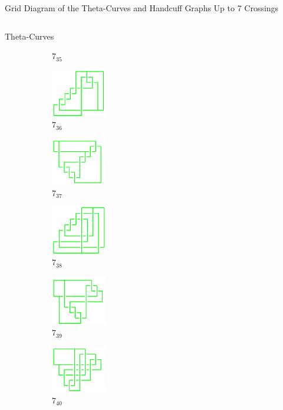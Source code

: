 \documentclass[final]{beamer}
\begin{document}
\begin{frame}[t]
\begin{alertblock}{Grid Diagram of the Theta-Curves and Handcuff Graphs Up to 7 Crossings}
\begin{columns}[t]
\begin{column}{0.6\textwidth}
\begin{alertblock}{Theta-Curves}
\begin{figure}
\begin{subfigure}{0.075\textwidth}
    \caption{$7_{35}$} 
    \end{subfigure}
    \begin{subfigure}{0.075\textwidth}
    \includegraphics[width=2.4cm]{../Midterm_Poster/grid_diagram/theta_7_36.png}
    \caption{$7_{36}$} 
    \end{subfigure}
    \begin{subfigure}{0.075\textwidth}
    \includegraphics[width=2.4cm]{../Midterm_Poster/grid_diagram/theta_7_37.png}
    \caption{$7_{37}$} 
    \end{subfigure}
    \begin{subfigure}{0.075\textwidth}
    \includegraphics[width=2.4cm]{../Midterm_Poster/grid_diagram/theta_7_38.png}
    \caption{$7_{38}$} 
    \end{subfigure}
    \begin{subfigure}{0.075\textwidth}
    \includegraphics[width=2.4cm]{../Midterm_Poster/grid_diagram/theta_7_39.png}
    \caption{$7_{39}$} 
    \end{subfigure}
    \begin{subfigure}{0.075\textwidth}
    \includegraphics[width=2.4cm]{../Midterm_Poster/grid_diagram/theta_7_40.png}
    \caption{$7_{40}$} 
    \end{subfigure}
    \begin{subfigure}{0.075\textwidth}

\end{subfigure}
\end{figure}
\end{alertblock}
\end{column}
\end{columns}
\end{alertblock}
\end{frame}
\end{document}
